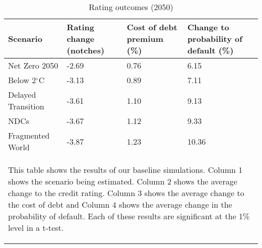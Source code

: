 
\begin{table}[tb!]
\footnotesize
\center
\caption{Rating outcomes (2050)}
\label{tab:tab3}
\begin{tabularx}{\textwidth}{X X X X}
\hline
Scenario & Rating change (notches) & Cost of debt premium (\%) & Change to probability of default (\%) \\
\hline
Net Zero 2050 & -2.69  &  0.76  &  6.15  \\
Below 2$^\circ$C & -3.13  &  0.89  &  7.11 \\
Delayed Transition & -3.61  &  1.10  &  9.13 \\
NDCs & -3.67  &  1.12  &  9.33 \\
Fragmented World & -3.87  &  1.23  &  10.36 \\
\hline
\multicolumn{4}{p{\textwidth}}{\begin{footnotesize}This table shows the results of our baseline simulations. Column 1 shows the scenario being estimated. Column 2 shows the average change to the credit rating. Column 3 shows the average change to the cost of debt and Column 4 shows the average change in the probability of default. Each of these results are significant at the 1\% level in a t-test.
\end{footnotesize}
}
\end{tabularx}
\end{table}
